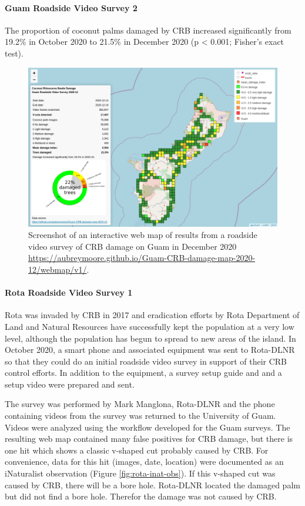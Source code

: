 \documentclass[12pt,letterpaper,english,bibliography=totocnumbered,abstract=on]{scrartcl}
\begin{document}
\clearpage
\paragraph{Guam Roadside Video Survey 2}

The proportion of coconut palms damaged by CRB increased significantly from 19.2\% in
October 2020 to 21.5\% in December 2020 (p < 0.001; Fisher's exact test).

\begin{figure}[h]
	\centering
	\includegraphics[width=1\linewidth]{images/crb-webmap-2020-12.png}
	\caption{Screenshot of an interactive web map of results from a roadside video survey of
		CRB damage on Guam in December 2020 \url{https://aubreymoore.github.io/Guam-CRB-damage-map-2020-12/webmap/v1/}.}
	\label{fig:guam02}
\end{figure}


\clearpage
\paragraph{Rota Roadside Video Survey 1}

Rota was invaded by CRB in 2017 and eradication efforts by Rota Department of Land and Natural Resources have successfully kept the population at a very low level, although the population has begun to spread to new areas of the island. In October 2020, a smart phone and associated equipment was sent to Rota-DLNR so that they could do an initial roadside video survey in support of their CRB control efforts. In addition to the equipment, a survey setup guide and  \cite{aubreymooreSetAutomatedRoadside2020} and a setup video \cite{mooreYouTubeVideoMounting2020} were prepared and sent.

The survey was performed by Mark Manglona, Rota-DLNR and the phone containing videos from the survey was returned to the University of Guam.  Videos were analyzed using the workflow developed for the Guam surveys. The resulting web map contained many false positives for CRB damage, but there is one hit which shows a classic v-shaped cut probably caused by CRB. For convenience, data for this hit (images, date, location) were documented as an iNaturalist observation (Figure \ref{fig:rota-inat-obs}). If this v-shaped cut was caused by CRB, there will be a bore hole. Rota-DLNR located the damaged palm but did not find a bore hole.  Therefor the damage was not caused by CRB.
\end{document}
